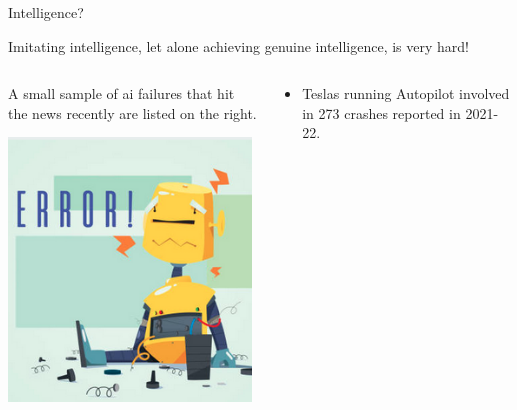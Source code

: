 %
%
%

\begin{frame}[t]{Intelligence?} 

    Imitating intelligence, let alone achieving genuine 
    intelligence, is very hard!\\
    \vspace{0.2cm}

    \begin{columns}
        \begin{column}{0.27\textwidth}
         {\small
           A small sample of \gls{ai} failures that hit the 
           news recently are listed on the right.\\
         }   
         \begin{center}
          \includegraphics[width=0.98\textwidth]{./images/misc/malfunctioning_robot_1.png}\\
         \end{center}
        \end{column}
        \begin{column}{0.73\textwidth}        
            \begin{itemize}
                \small
                \item 
                Teslas running Autopilot involved in 273 crashes reported in 2021-22.

\end{itemize}
\end{column}
\end{columns}
\end{frame}
